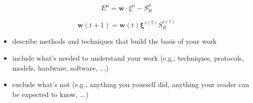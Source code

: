 \begin{equation} \label{perceptron-error}
    E^\mu = \mathsf{\bm{w}} \cdotp \xi^\mu - S^\mu_R
\end{equation}

\begin{equation} \label{perceptron-weight-update}
    \mathsf{\bm{w}}(t+1) = \mathsf{\bm{w}}(t) \bm{\xi}^{v(7)} S^{v(t)}_R
\end{equation}

\begin{itemize}
\item describe methods and techniques that build the basis of your work
\item include what's needed to understand your work (e.g., techniques, protocols, models, hardware, software, ...)
\item exclude what's not (e.g., anything you yourself did, anything your reader can be expected to know, ...)
\end{itemize}

